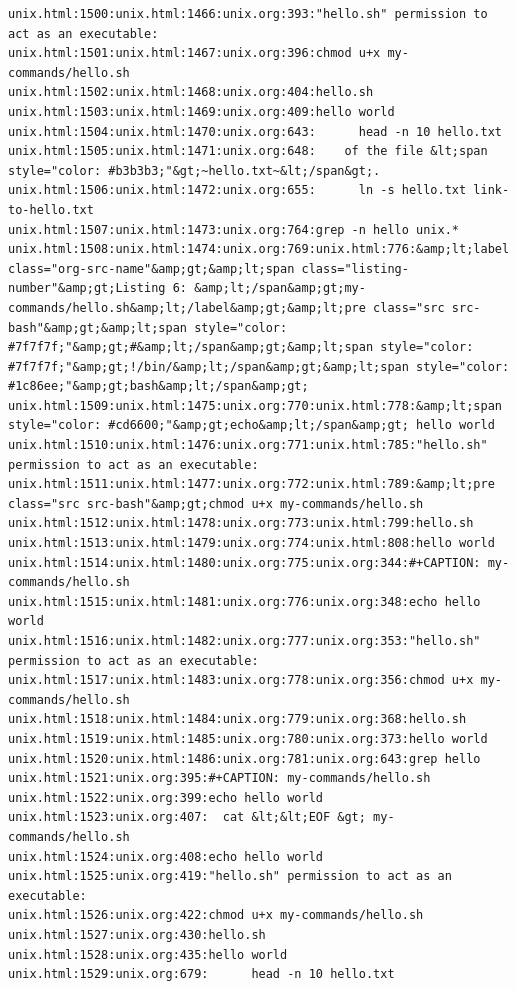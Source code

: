 \documentclass[11pt]{article}
\begin{document}
\begin{verbatim}
unix.html:1500:unix.html:1466:unix.org:393:"hello.sh" permission to act as an executable:
unix.html:1501:unix.html:1467:unix.org:396:chmod u+x my-commands/hello.sh
unix.html:1502:unix.html:1468:unix.org:404:hello.sh
unix.html:1503:unix.html:1469:unix.org:409:hello world
unix.html:1504:unix.html:1470:unix.org:643:      head -n 10 hello.txt
unix.html:1505:unix.html:1471:unix.org:648:    of the file &lt;span style="color: #b3b3b3;"&gt;~hello.txt~&lt;/span&gt;.
unix.html:1506:unix.html:1472:unix.org:655:      ln -s hello.txt link-to-hello.txt
unix.html:1507:unix.html:1473:unix.org:764:grep -n hello unix.*
unix.html:1508:unix.html:1474:unix.org:769:unix.html:776:&amp;lt;label class="org-src-name"&amp;gt;&amp;lt;span class="listing-number"&amp;gt;Listing 6: &amp;lt;/span&amp;gt;my-commands/hello.sh&amp;lt;/label&amp;gt;&amp;lt;pre class="src src-bash"&amp;gt;&amp;lt;span style="color: #7f7f7f;"&amp;gt;#&amp;lt;/span&amp;gt;&amp;lt;span style="color: #7f7f7f;"&amp;gt;!/bin/&amp;lt;/span&amp;gt;&amp;lt;span style="color: #1c86ee;"&amp;gt;bash&amp;lt;/span&amp;gt;
unix.html:1509:unix.html:1475:unix.org:770:unix.html:778:&amp;lt;span style="color: #cd6600;"&amp;gt;echo&amp;lt;/span&amp;gt; hello world
unix.html:1510:unix.html:1476:unix.org:771:unix.html:785:"hello.sh" permission to act as an executable:
unix.html:1511:unix.html:1477:unix.org:772:unix.html:789:&amp;lt;pre class="src src-bash"&amp;gt;chmod u+x my-commands/hello.sh
unix.html:1512:unix.html:1478:unix.org:773:unix.html:799:hello.sh
unix.html:1513:unix.html:1479:unix.org:774:unix.html:808:hello world
unix.html:1514:unix.html:1480:unix.org:775:unix.org:344:#+CAPTION: my-commands/hello.sh
unix.html:1515:unix.html:1481:unix.org:776:unix.org:348:echo hello world
unix.html:1516:unix.html:1482:unix.org:777:unix.org:353:"hello.sh" permission to act as an executable:
unix.html:1517:unix.html:1483:unix.org:778:unix.org:356:chmod u+x my-commands/hello.sh
unix.html:1518:unix.html:1484:unix.org:779:unix.org:368:hello.sh
unix.html:1519:unix.html:1485:unix.org:780:unix.org:373:hello world
unix.html:1520:unix.html:1486:unix.org:781:unix.org:643:grep hello 
unix.html:1521:unix.org:395:#+CAPTION: my-commands/hello.sh
unix.html:1522:unix.org:399:echo hello world
unix.html:1523:unix.org:407:  cat &lt;&lt;EOF &gt; my-commands/hello.sh
unix.html:1524:unix.org:408:echo hello world
unix.html:1525:unix.org:419:"hello.sh" permission to act as an executable:
unix.html:1526:unix.org:422:chmod u+x my-commands/hello.sh
unix.html:1527:unix.org:430:hello.sh
unix.html:1528:unix.org:435:hello world
unix.html:1529:unix.org:679:      head -n 10 hello.txt

\end{verbatim}
\end{document}
